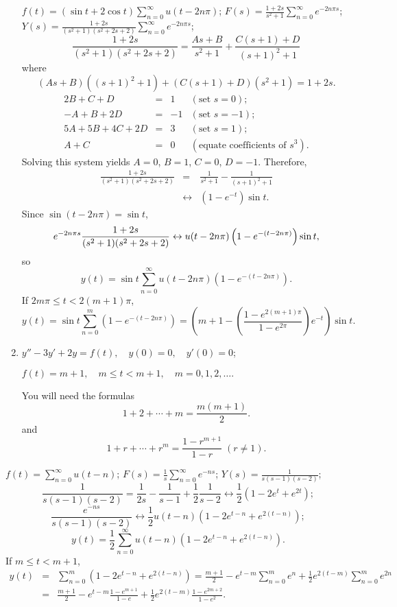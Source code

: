 \documentclass{ximera}
\begin{document}
\begin{problem}
\begin{enumerate}
\begin{solution}
$f(t)=(\sin t+2\cos t)\sum_{n=0}^\infty u(t-2n\pi)$;
$F(s)=\frac{1+2s}{s^2+1}\sum_{n=0}^\infty e^{-2n\pi s}$;
$Y(s)=\frac{1+2s}{(s^2+1)(s^2+2s+2)}\sum_{n=0}^\infty e^{-2n\pi s}$;
$$
\frac{1+2s}{(s^2+1)(s^2+2s+2)}=\frac{As+B}{s^2+1}+\frac{C(s+1)+D}{(s+1)^2+1}
$$
where
$$
(As+B)((s+1)^2+1)+(C(s+1)+D)(s^2+1)=1+2s.
$$
$$
\begin{array}{rcrl}
2B+C+D&=&1&(\mbox{set }s=0);\\
-A+B+2D&=&-1& (\mbox{set }s=-1);\\
5A+5B+4C+2D&=&3&(\mbox{set }s=1);\\
A+C&=&0&(\mbox{equate coefficients of }s^3).
\end{array}
$$
Solving this system yields $A=0$, $B=1$,
$C=0$, $D=-1$. Therefore,
\begin{eqnarray*}
\frac{1+2s}{(s^2+1)(s^2+2s+2)}
&=&\frac{1}{s^2+1}-\frac{1}{(s+1)^2+1}
\\&\leftrightarrow&\left(1-e^{-t}\right)\sin t.
\end{eqnarray*}
Since $\sin(t-2n\pi)=\sin t$,
$$
e^{-2n\pi s}{1+2s\over(s^2+1)(s^2+2s+2)}\leftrightarrow
u(t-2n\pi)\left(1-e^{-(t-2n\pi)}\right)\sin t,
$$
so
$$
y(t)=\sin t\sum_{n=0}^\infty u(t-2n\pi)\left(1-e^{-(t-2n\pi)}\right).
$$
If $2m\pi\le t<2(m+1)\pi$,
$$
y(t)=\sin t\sum_{n=0}^m\left(1-e^{-(t-2n\pi)}\right)=
\left(m+1-\left(\frac{1-e^{2(m+1)\pi}}{1-e^{2\pi}}\right)e^{-t}\right)\sin t.
$$
\end{solution}

\item %
$y''-3y'+2y=f(t), \quad  y(0)=0,\quad y'(0)=0$;

$f(t)=m+1,\quad  m\le t<m+1,\quad m=0,1,2,\dots.$

\begin{hint}
You will need the formulas
$$
1+2+\cdots+m=\frac{m(m+1)}{2}.
$$ 
and
$$
1+r+\cdots+r^m=\frac{1-r^{m+1}}{1-r}\; (r\ne1).
$$
\end{hint}
\end{enumerate}

\begin{solution}
$f(t)=\sum_{n=0}^\infty u(t-n)$; $F(s)=\frac{1}{s}\sum_{n=0}^\infty e^{-ns}$; $Y(s)=\frac{1}{s(s-1)(s-2)}$;
$$
\frac{1}{s(s-1)(s-2)}=\frac{1}{2s}-\frac{1}{s-1}+\frac{1}{2}\frac{1}{s-2}
\leftrightarrow \frac{1}{2}\left(1-2e^t+e^{2t}\right);
$$
$$
\frac{e^{-ns}}{s(s-1)(s-2)}
\leftrightarrow \frac{1}{2}u(t-n)\left(1-2e^{t-n}+e^{2(t-n)}\right);
$$
$$
y(t)=\frac{1}{2}\sum_{n=0}^\infty
u(t-n)\left(1-2e^{t-n}+e^{2(t-n)}\right).
$$
If $m\le t< m+1$,
\begin{eqnarray*}
y(t)&=&\sum_{n=0}^m\left(1-2e^{t-n}+e^{2(t-n)}\right)
=\frac{m+1}{2}-e^{t-m}\sum_{n=0}^m e^n
 +\frac{1}{2}e^{2(t-m)}\sum_{n=0}^m e^{2n}\\
&=&\frac{m+1}{2}-e^{t-m}\frac{1-e^{m+1}}{1-e}+\frac{1}{2}e^{2(t-m)}\frac{1-e^{2m+2}}{1-e^2}.
\end{eqnarray*}
\end{solution}
\end{problem}
\end{document}
